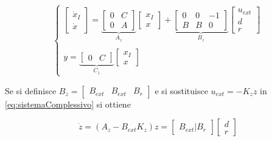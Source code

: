 		\begin{equation}
			\begin{cases}
				\begin{bmatrix}
					\dot{x}_I \\
					\dot{x}
				\end{bmatrix}
				=
				\underbrace{
				\begin{bmatrix}
					0 & C \\
					0 & A
				\end{bmatrix}
				}_\text{$A_z$}
				\begin{bmatrix}
					x_I \\
					x
				\end{bmatrix}
				+
				\underbrace{
				\begin{bmatrix}
					0 & 0 & -1 \\
					B & B & 0
				\end{bmatrix}
				}_\text{$B_z$}
				\begin{bmatrix}
					u_{ext} \\
					d       \\
					r
				\end{bmatrix} \\
				\\ %
				y=
				\underbrace{
				\begin{bmatrix}
					0 & C
				\end{bmatrix}
				}_\text{$C_z$}
				\begin{bmatrix}
					x_I \\
					x
				\end{bmatrix}
			\end{cases}
			\label{eq:sistemaComplessivo}
		\end{equation}
	
		\noindent Se si definisce $B_z=\begin{bmatrix}B_{ext} & B_{ext} & B_r\end{bmatrix}$ e si sostituisce $u_{ext}=-K_zz$ in \ref{eq:sistemaComplessivo} si ottiene
		
		\begin{equation*}
			\dot{z}=(A_z - B_{ext}K_z)z=
			\begin{bmatrix}
				B_{ext} | B_r
			\end{bmatrix}
			\begin{bmatrix}
				d \\
				r
			\end{bmatrix}
		\end{equation*}
		
